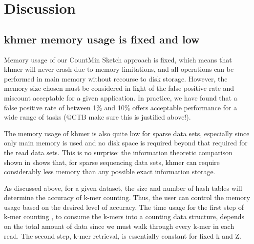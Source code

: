 \documentclass{article}
\begin{document}

\section{Discussion}

\subsection{khmer memory usage is fixed and low}

Memory usage of our CountMin Sketch approach is fixed, which means
that khmer will never crash due to memory limitations, and all
operations can be performed in main memory without recourse to disk
storage.  However, the memory size chosen must be considered in light
of the false positive rate and miscount acceptable for a given
application.  In practice, we have found that a false positive rate of
between 1\% and 10\% offers acceptable performance for a wide range of
tasks (@CTB make sure this is justified above!).

The memory usage of khmer is also quite low for sparse data sets,
especially since only main memory is used and no disk space is
required beyond that required for the read data sets.  This is no
surprise: the information theoretic comparison shown in
\cite{pellpnas} shows that, for sparse sequencing data sets, khmer can
require considerably less memory than any possible exact information
storage.

As discussed above, for a given dataset, the size and number of hash
tables will determine the accuracy of k-mer counting. Thus, the user
can control the memory usage based on the desired level of
accuracy. The time usage for the first step of k-mer counting , to
consume the k-mers into a counting data structure, depends on the
total amount of data since we must walk through every k-mer in each
read. The second step, k-mer retrieval, is essentially constant for
fixed k and Z.
\end{document}

